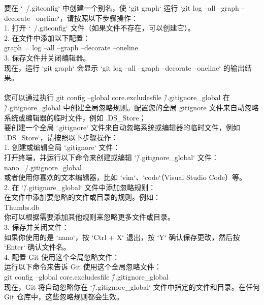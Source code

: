 \documentclass[a4paper, 12pt]{article}
\begin{document}
要在 `~/.gitconfig` 中创建一个别名，使 `git graph` 运行 `git log --all --graph --decorate --oneline`，请按照以下步骤操作：\\
1. 打开 `~/.gitconfig` 文件（如果文件不存在，可以创建它）。\\
2. 在文件中添加以下配置：\\
   graph = log --all --graph --decorate --oneline\\
3. 保存文件并关闭编辑器。\\
现在，运行 `git graph` 会显示 `git log --all --graph --decorate --oneline` 的输出结果。\\\\
您可以通过执行 git config --global core.excludesfile \~/.gitignore\_global 在 \~/.gitignore\_global 中创建全局忽略规则。配置您的全局 gitignore 文件来自动忽略系统或编辑器的临时文件，例如 .DS\_Store；\\
要创建一个全局 `.gitignore` 文件来自动忽略系统或编辑器的临时文件，例如 `.DS\_Store`，请按照以下步骤操作：\\
1. 创建或编辑全局 `.gitignore` 文件：\\
   打开终端，并运行以下命令来创建或编辑 `\~/.gitignore\_global` 文件：\\
   nano ~/.gitignore\_global\\
   或者使用你喜欢的文本编辑器，比如 `vim`、`code`（Visual Studio Code）等。\\
2. 在 `\~/.gitignore\_global` 文件中添加忽略规则：\\
   在文件中添加要忽略的文件或目录的规则。例如：\\
   Thumbs.db\\
   你可以根据需要添加其他规则来忽略更多文件或目录。\\
3. 保存并关闭文件：\\
   如果你使用的是 `nano`，按 `Ctrl + X` 退出，按 `Y` 确认保存更改，然后按 `Enter` 确认文件名。\\
4. 配置 Git 使用这个全局忽略文件：\\
   运行以下命令来告诉 Git 使用这个全局忽略文件：\\
   git config --global core.excludesfile \~/.gitignore\_global\\
现在，Git 将自动忽略你在 `\~/.gitignore\_global` 文件中指定的文件和目录。在任何 Git 仓库中，这些忽略规则都会生效。\\
\end{document}
